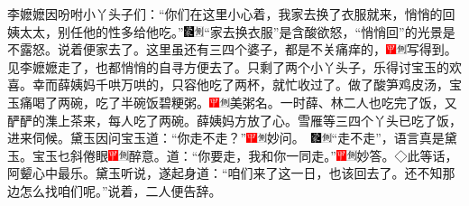 李嬷嬷因吩咐小丫头子们：``你们在这里小心着，我家去换了衣服就来，悄悄的回姨太太，别任他的性多给他吃。''{\includegraphics[width=3mm]{../Images/00006}\includegraphics[width=3mm]{../Images/00011}\footnotesize \kaishu ``家去换衣服''是含酸欲怒，``悄悄回''的光景是不露怒。}说着便家去了。这里虽还有三四个婆子，都是不关痛痒的，{\includegraphics[width=3mm]{../Images/00002}\includegraphics[width=3mm]{../Images/00011}\footnotesize \kaishu 写得到。}见李嬷嬷走了，也都悄悄的自寻方便去了。只剩了两个小丫头子，乐得讨宝玉的欢喜。幸而薛姨妈千哄万哄的，只容他吃了两杯，就忙收过了。做了酸笋鸡皮汤，宝玉痛喝了两碗，吃了半碗饭碧粳粥。{\includegraphics[width=3mm]{../Images/00002}\includegraphics[width=3mm]{../Images/00011}\footnotesize \kaishu 美粥名。}一时薛、林二人也吃完了饭，又酽酽的潗上茶来，每人吃了两碗。薛姨妈方放了心。雪雁等三四个丫头已吃了饭，进来伺候。黛玉因问宝玉道：``你走不走？''{{\includegraphics[width=3mm]{../Images/00002}\includegraphics[width=3mm]{../Images/00011}\footnotesize \kaishu 妙问。　}\includegraphics[width=3mm]{../Images/00006}\includegraphics[width=3mm]{../Images/00011}\footnotesize \kaishu ``走不走''，语言真是黛玉。}宝玉乜斜倦眼{\includegraphics[width=3mm]{../Images/00002}\includegraphics[width=3mm]{../Images/00011}\footnotesize \kaishu 醉意。}道：``你要走，我和你一同走。''{\includegraphics[width=3mm]{../Images/00002}\includegraphics[width=3mm]{../Images/00011}\footnotesize \kaishu 妙答。◇此等话，阿颦心中最乐。}黛玉听说，遂起身道：``咱们来了这一日，也该回去了。还不知那边怎么找咱们呢。''说着，二人便告辞。


